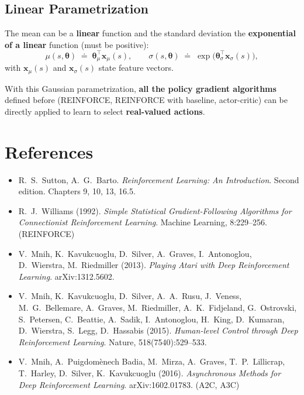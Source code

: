 \documentclass[11pt,a4paper]{article}
\theoremstyle{definition}
\theoremstyle{plain}
\theoremstyle{remark}
\begin{document}
\subsection{Linear Parametrization}

The mean can be a \textbf{linear} function and the standard deviation the \textbf{exponential of a linear} function (must be positive):
\[
    \mu(s, \boldsymbol{\theta}) \;\doteq\; \boldsymbol{\theta}_\mu^\top \mathbf{x}_\mu(s), \qquad \sigma(s, \boldsymbol{\theta}) \;\doteq\; \exp\!\bigl(\boldsymbol{\theta}_\sigma^\top \mathbf{x}_\sigma(s)\bigr),
\]
with $\mathbf{x}_\mu(s)$ and $\mathbf{x}_\sigma(s)$ state feature vectors.

\begin{tcolorbox}[colback=blue!5!white, colframe=blue!60!black, title={Take-Away}]
With this Gaussian parametrization, \textbf{all the policy gradient algorithms} defined before (REINFORCE, REINFORCE with baseline, actor-critic) can be directly applied to learn to select \textbf{real-valued actions}.
\end{tcolorbox}

\section*{References}

\begin{itemize}
    \item R.\ S.\ Sutton, A.\ G.\ Barto. \emph{Reinforcement Learning: An Introduction}. Second edition. Chapters 9, 10, 13, 16.5.
    \item R.\ J.\ Williams (1992). \emph{Simple Statistical Gradient-Following Algorithms for Connectionist Reinforcement Learning}. Machine Learning, 8:229--256. (REINFORCE)
    \item V.\ Mnih, K.\ Kavukcuoglu, D.\ Silver, A.\ Graves, I.\ Antonoglou, D.\ Wierstra, M.\ Riedmiller (2013). \emph{Playing Atari with Deep Reinforcement Learning}. arXiv:1312.5602.
    \item V.\ Mnih, K.\ Kavukcuoglu, D.\ Silver, A.\ A.\ Rusu, J.\ Veness, M.\ G.\ Bellemare, A.\ Graves, M.\ Riedmiller, A.\ K.\ Fidjeland, G.\ Ostrovski, S.\ Petersen, C.\ Beattie, A.\ Sadik, I.\ Antonoglou, H.\ King, D.\ Kumaran, D.\ Wierstra, S.\ Legg, D.\ Hassabis (2015). \emph{Human-level Control through Deep Reinforcement Learning}. Nature, 518(7540):529--533.
    \item V.\ Mnih, A.\ Puigdom\`enech Badia, M.\ Mirza, A.\ Graves, T.\ P.\ Lillicrap, T.\ Harley, D.\ Silver, K.\ Kavukcuoglu (2016). \emph{Asynchronous Methods for Deep Reinforcement Learning}. arXiv:1602.01783. (A2C, A3C)
\end{itemize}
\end{document}
